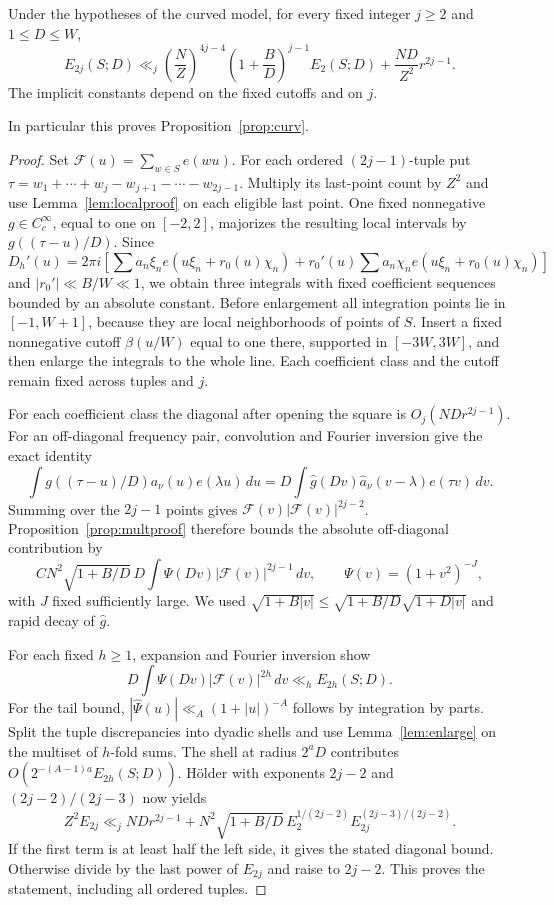 \begin{proposition}\label{prop:allenergy}
Under the hypotheses of the curved model, for every fixed integer $j\ge2$
and $1\le D\le W$,
\[
 E_{2j}(S;D)\ll_j
 \left(\frac NZ\right)^{4j-4}
 \left(1+\frac BD\right)^{j-1}E_2(S;D)
 +\frac{ND}{Z^2}r^{2j-1}.
\]
The implicit constants depend on the fixed cutoffs and on $j$.
\end{proposition}
In particular this proves Proposition~\ref{prop:curv}.
\begin{proof}
Set $\mathcal F(u)=\sum_{w\in S}e(wu)$. For each ordered $(2j-1)$-tuple put
$\tau=w_1+\cdots+w_j-w_{j+1}-\cdots-w_{2j-1}$.
Multiply its last-point count by $Z^2$ and use
Lemma~\ref{lem:localproof} on each eligible last point.
One fixed nonnegative $g\in C_c^\infty$, equal to one on $[-2,2]$,
majorizes the resulting local intervals by $g((\tau-u)/D)$.
Since
\[
 D_h'(u)=2\pi i\left[\sum a_n\xi_ne(u\xi_n+r_0(u)\chi_n)
 +r_0'(u)\sum a_n\chi_ne(u\xi_n+r_0(u)\chi_n)\right]
\]
and $|r_0'|\ll B/W\ll1$, we obtain three integrals with fixed
coefficient sequences bounded by an absolute constant.
Before enlargement all integration points lie in $[-1,W+1]$, because
they are local neighborhoods of points of $S$. Insert a fixed
nonnegative cutoff $\beta(u/W)$ equal to one there, supported in
$[-3W,3W]$, and then enlarge the integrals to the whole line.
Each coefficient class and the cutoff remain fixed across tuples and $j$.

For each coefficient class the diagonal after opening the square is
$O_j(NDr^{2j-1})$. For an off-diagonal frequency pair, convolution and
Fourier inversion give the exact identity
\[
 \int g((\tau-u)/D)a_\nu(u)e(\lambda u)\,du
 =D\int\widehat g(Dv)\widehat a_\nu(v-\lambda)e(\tau v)\,dv.
\]
Summing over the $2j-1$ points gives $\mathcal F(v)|\mathcal F(v)|^{2j-2}$.
Proposition~\ref{prop:multproof} therefore bounds the absolute
off-diagonal contribution by
\[
 CN^2\sqrt{1+B/D}\,D\int\Psi(Dv)|\mathcal F(v)|^{2j-1}\,dv,
 \qquad \Psi(v)=(1+v^2)^{-J},
\]
with $J$ fixed sufficiently large. We used
$\sqrt{1+B|v|}\le\sqrt{1+B/D}\sqrt{1+D|v|}$ and rapid decay of
$\widehat g$.

For each fixed $h\ge1$, expansion and Fourier inversion show
\[
 D\int\Psi(Dv)|\mathcal F(v)|^{2h}\,dv\ll_h E_{2h}(S;D).
\]
For the tail bound, $|\widehat\Psi(u)|\ll_A(1+|u|)^{-A}$ follows by integration
by parts. Split the tuple discrepancies into dyadic shells and use
Lemma~\ref{lem:enlarge} on the multiset of $h$-fold sums. The shell at
radius $2^aD$ contributes $O(2^{-(A-1)a}E_{2h}(S;D))$.
H\"older with exponents $2j-2$ and $(2j-2)/(2j-3)$ now yields
\[
 Z^2E_{2j}\ll_j NDr^{2j-1}
 +N^2\sqrt{1+B/D}\,
 E_2^{1/(2j-2)}E_{2j}^{(2j-3)/(2j-2)}.
\]
If the first term is at least half the left side, it gives the stated
diagonal bound. Otherwise divide by the last power of $E_{2j}$ and
raise to $2j-2$. This proves the statement, including all ordered tuples.
\end{proof}

